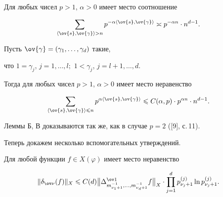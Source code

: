 \begin{alem}


Для любых чисел $p>1$, $\alpha>0$ имеет место соотношение


$$


\sum_{\la\ov{s},\ov{\gamma}\ra >n}p^{-\alpha\la\ov{s},\ov{\gamma}\ra}\asymp 


p^{-\alpha n}\cdot n^{d-1}.


$$


\end{alem}








\begin{alem}


Пусть $\ov{\gamma}=(\gamma_{1},\dotsc,\gamma_{d})$ такие, 


что $1=\gamma_{j}$, $j=1,\dotsc,l;$ $1<\gamma_{j}$, $j=l+1,\dotsc,d$.


Тогда для любых чисел $p>1$, $\alpha>0$ имеет место неравенство


$$


\sum_{\la\ov{s},\ov{\gamma}\ra\leq n}p^{\alpha\la\ov{s},\ov{\gamma}\ra}\leq 


C(\alpha,p)\cdot p^{\alpha n}\cdot n^{d-1}.


$$


\end{alem}





Леммы Б, В доказываются так же, как в случае $p=2$ ([9], с.\,11). 





Теперь докажем несколько вспомогательных утверждений.  


   





\begin{lem}


Для любой функции  $f\in X(\varphi)$ имеет место неравенство


$$


\|\delta_{\ov\nu}(f)\|_{X}\leq 


C(d)\big\|\Delta_{m^{-1}_{\nu_1+1},\dotsc,m^{-1}_{\nu_d+1}} ^{\ov 


1}f\big\|_{X}\cdot\prod_{j=1}^{d}p_{\nu_{j}+1}^{(j)}


\ln p_{\nu_{j}+1}^{(j)}.


$$


\end{lem}








